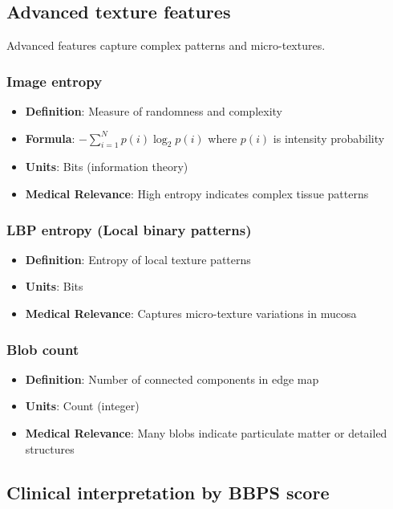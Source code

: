\documentclass[11pt]{article}
\begin{document}
\subsection{Advanced texture features}

Advanced features capture complex patterns and micro-textures.

\subsubsection{Image entropy}
\begin{itemize}
    \item \textbf{Definition}: Measure of randomness and complexity
    \item \textbf{Formula}: $\displaystyle -\sum_{i=1}^N p(i) \log_2 p(i)$ where $p(i)$ is intensity probability
    \item \textbf{Units}: Bits (information theory)
    \item \textbf{Medical Relevance}: High entropy indicates complex tissue patterns
\end{itemize}

\subsubsection{LBP entropy (Local binary patterns)}
\begin{itemize}
    \item \textbf{Definition}: Entropy of local texture patterns
    \item \textbf{Units}: Bits
    \item \textbf{Medical Relevance}: Captures micro-texture variations in mucosa
\end{itemize}

\subsubsection{Blob count}
\begin{itemize}
    \item \textbf{Definition}: Number of connected components in edge map
    \item \textbf{Units}: Count (integer)
    \item \textbf{Medical Relevance}: Many blobs indicate particulate matter or detailed structures
\end{itemize}

\subsection{Clinical interpretation by BBPS score}
\end{document}
